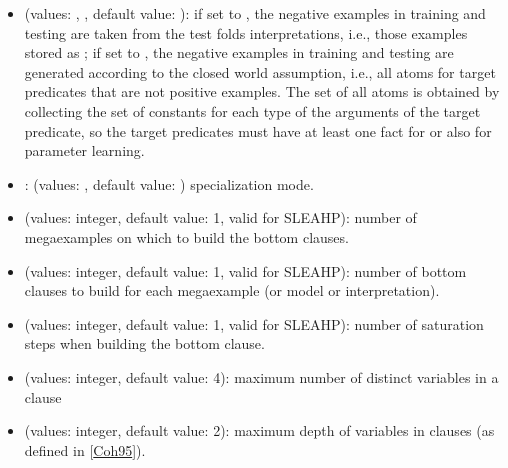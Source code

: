 \documentclass[letterpaper,10pt,english]{sphinxmanual}
\begin{document}
\begin{itemize}
\item {} 
\sphinxAtStartPar
{} (values: , , default value: ): if set to , the negative examples in training and testing are taken from the test folds interpretations, i.e., those examples  stored as ; if set to , the negative examples in training and testing are generated according to the closed world assumption, i.e., all atoms for target predicates that are not positive examples. The set of all atoms is obtained by collecting the set of constants for each type of the arguments of the target predicate, so the target predicates must have at least one fact for  or  also for parameter learning.

\item {} 
\sphinxAtStartPar
{}: (values: , default value: ) specialization mode.

\item {} 
\sphinxAtStartPar
{} (values: integer, default value: 1, valid for SLEAHP): number of mega\sphinxhyphen{}examples on which to build the bottom clauses.

\item {} 
\sphinxAtStartPar
{} (values: integer, default value: 1, valid for SLEAHP): number of bottom clauses to build for each mega\sphinxhyphen{}example (or model or interpretation).

\item {} 
\sphinxAtStartPar
{} (values: integer, default value: 1, valid for SLEAHP): number of saturation steps when building the bottom clause.

\item {} 
\sphinxAtStartPar
{} (values: integer, default value: 4): maximum number of distinct variables in a clause

\item {} 
\sphinxAtStartPar
{} (values: integer, default value: 2): maximum depth of variables in clauses (as defined in {[}\hyperlink{cite.index:id23}{Coh95}{]}).


\end{itemize}
\end{document}
